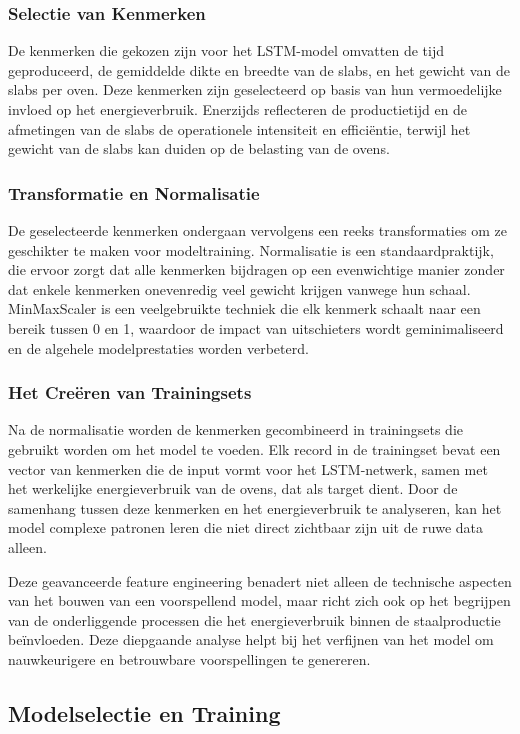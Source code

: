 \subsubsection{Selectie van Kenmerken}
De kenmerken die gekozen zijn voor het LSTM-model omvatten de tijd geproduceerd, de gemiddelde dikte en breedte van de slabs, en het gewicht van de slabs per oven. Deze kenmerken zijn geselecteerd op basis van hun vermoedelijke invloed op het energieverbruik. Enerzijds reflecteren de productietijd en de afmetingen van de slabs de operationele intensiteit en efficiëntie, terwijl het gewicht van de slabs kan duiden op de belasting van de ovens.

\subsubsection{Transformatie en Normalisatie}
De geselecteerde kenmerken ondergaan vervolgens een reeks transformaties om ze geschikter te maken voor modeltraining. Normalisatie is een standaardpraktijk, die ervoor zorgt dat alle kenmerken bijdragen op een evenwichtige manier zonder dat enkele kenmerken onevenredig veel gewicht krijgen vanwege hun schaal. MinMaxScaler is een veelgebruikte techniek die elk kenmerk schaalt naar een bereik tussen 0 en 1, waardoor de impact van uitschieters wordt geminimaliseerd en de algehele modelprestaties worden verbeterd.

\subsubsection{Het Creëren van Trainingsets}
Na de normalisatie worden de kenmerken gecombineerd in trainingsets die gebruikt worden om het model te voeden. Elk record in de trainingset bevat een vector van kenmerken die de input vormt voor het LSTM-netwerk, samen met het werkelijke energieverbruik van de ovens, dat als target dient. Door de samenhang tussen deze kenmerken en het energieverbruik te analyseren, kan het model complexe patronen leren die niet direct zichtbaar zijn uit de ruwe data alleen.

Deze geavanceerde feature engineering benadert niet alleen de technische aspecten van het bouwen van een voorspellend model, maar richt zich ook op het begrijpen van de onderliggende processen die het energieverbruik binnen de staalproductie beïnvloeden. Deze diepgaande analyse helpt bij het verfijnen van het model om nauwkeurigere en betrouwbare voorspellingen te genereren.

\subsection{Modelselectie en Training}

